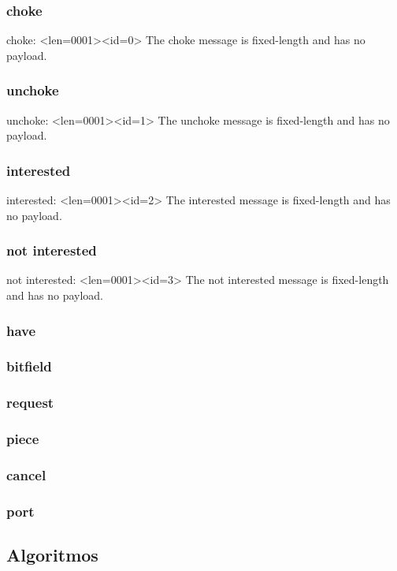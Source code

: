 \subsubsection*{choke}
choke: <len=0001><id=0>
The choke message is fixed-length and has no payload.

\subsubsection*{unchoke}
unchoke: <len=0001><id=1>
The unchoke message is fixed-length and has no payload.

\subsubsection*{interested}
interested: <len=0001><id=2>
The interested message is fixed-length and has no payload.

\subsubsection*{not interested}
not interested: <len=0001><id=3>
The not interested message is fixed-length and has no payload.

\subsubsection*{have}

\subsubsection*{bitfield}

\subsubsection*{request}

\subsubsection*{piece}

\subsubsection*{cancel}

\subsubsection*{port}


\subsection*{Algoritmos}